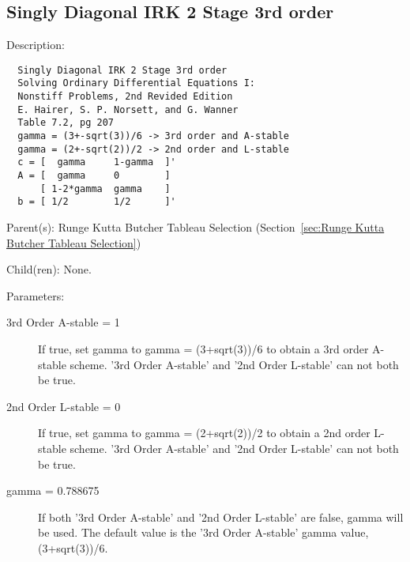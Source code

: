 \subsection{Singly Diagonal IRK 2 Stage 3rd order}
\label{sec:Singly Diagonal IRK 2 Stage 3rd order}

\begin{list}{}
  {\setlength{\leftmargin}{1.0in}
   \setlength{\labelwidth}{0.75in}
   \setlength{\labelsep}{0.125in}}
  \item[Description:]
\begin{verbatim}
  Singly Diagonal IRK 2 Stage 3rd order
  Solving Ordinary Differential Equations I:
  Nonstiff Problems, 2nd Revided Edition
  E. Hairer, S. P. Norsett, and G. Wanner
  Table 7.2, pg 207
  gamma = (3+-sqrt(3))/6 -> 3rd order and A-stable
  gamma = (2+-sqrt(2))/2 -> 2nd order and L-stable
  c = [  gamma     1-gamma  ]'
  A = [  gamma     0        ]
      [ 1-2*gamma  gamma    ]
  b = [ 1/2        1/2      ]'
\end{verbatim}
  \item[Parent(s):]
    Runge Kutta Butcher Tableau Selection (Section~\ref{sec:Runge Kutta Butcher Tableau Selection})
  \item[Child(ren):]
    None. 
  \item[Parameters:]
    \begin{description}
      \item[3rd Order A-stable = 1] 
If true, set gamma to gamma = (3+sqrt(3))/6 to obtain a 3rd order A-stable scheme. '3rd Order A-stable' and '2nd Order L-stable' can not both be true.
      \item[2nd Order L-stable = 0] 
If true, set gamma to gamma = (2+sqrt(2))/2 to obtain a 2nd order L-stable scheme. '3rd Order A-stable' and '2nd Order L-stable' can not both be true.
      \item[gamma = 0.788675] 
If both '3rd Order A-stable' and '2nd Order L-stable' are false, gamma will be used. The default value is the '3rd Order A-stable' gamma value, (3+sqrt(3))/6.
\end{description}

\end{list}

